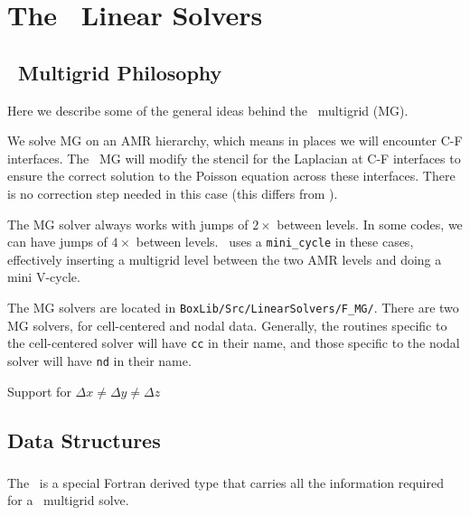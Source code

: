 \section{The \BoxLib\ Linear Solvers}

\label{ch:mg}


\subsection{\BoxLib\ Multigrid Philosophy}

Here we describe some of the general ideas behind the \BoxLib\
multigrid (MG).

We solve MG on an AMR hierarchy, which means in places we will encounter
C-F interfaces.  The \BoxLib\ MG will modify the stencil for the Laplacian
at C-F interfaces to ensure the correct solution to the Poisson equation
across these interfaces.  There is no correction step needed in this
case (this differs from \cite{ricker:2008}).

The MG solver always works with jumps of $2\times$ between levels.  In 
some codes, we can have jumps of $4\times$ between
levels.  \BoxLib\ uses a {\tt mini\_cycle} in these cases, effectively
inserting a multigrid level between the two AMR levels and doing a mini
V-cycle.

The MG solvers are located in {\tt BoxLib/Src/LinearSolvers/F\_MG/}.
There are two MG solvers, for cell-centered and nodal data.
Generally, the routines specific to the cell-centered solver will have
{\tt cc} in their name, and those specific to the nodal solver will have
{\tt nd} in their name.

Support for $\Delta x \ne \Delta y \ne \Delta z$




\subsection{Data Structures}

\subsubsection{\mgtower}

The \mgtower\ is a special Fortran derived type that carries all the
information required for a \BoxLib\ multigrid solve.

